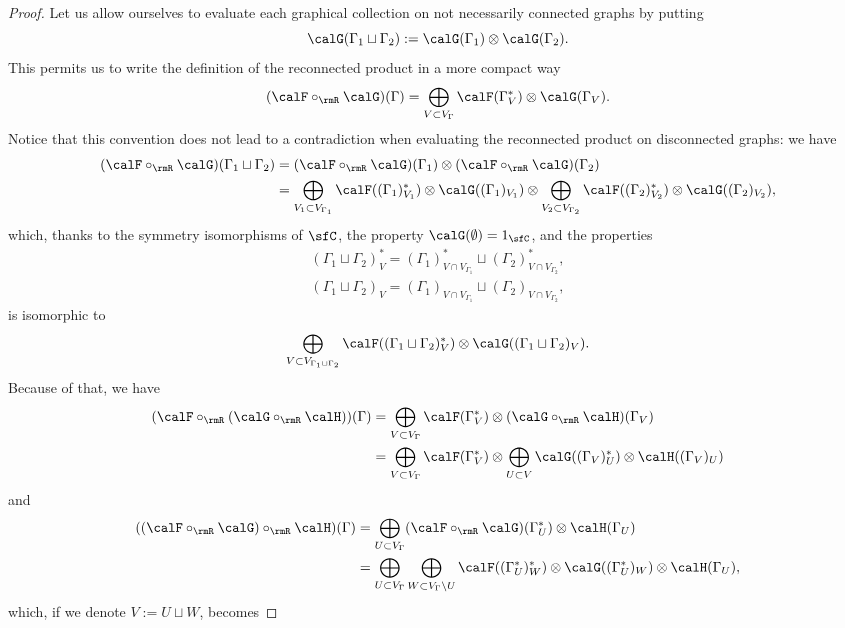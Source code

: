 \begin{proof}
Let us allow ourselves to evaluate each graphical collection on not necessarily connected graphs by putting 
 \[
\calG(\Gamma_1\sqcup\Gamma_2):=\calG(\Gamma_1)\otimes\calG(\Gamma_2).
 \]
This permits us to write the definition of the reconnected product in a more compact way
 \[
(\calF\circ_{\rmR}\calG)(\Gamma)=\bigoplus_{V\subset V_\Gamma}\calF(\Gamma^*_V)\otimes\calG(\Gamma_V).
 \]
Notice that this convention does not lead to a contradiction when evaluating the reconnected product on disconnected graphs: we have 
\begin{align*}
(\calF\circ_{\rmR}\calG)(\Gamma_1\sqcup\Gamma_2) &=
(\calF\circ_{\rmR}\calG)(\Gamma_1)\otimes (\calF\circ_{\rmR}\calG)(\Gamma_2)\\
&= \bigoplus_{V_1\subset V_{\Gamma_1}}\calF((\Gamma_1)^*_{V_1})\otimes\calG((\Gamma_1)_{V_1})\otimes
\bigoplus_{V_2\subset V_{\Gamma_2}}\calF((\Gamma_2)^*_{V_2})\otimes\calG((\Gamma_2)_{V_2}),
\end{align*}
which, thanks to the symmetry isomorphisms of $\sfC$, the property $\calG(\emptyset)=1_{\sfC}$, and the properties
\begin{gather*}
(\Gamma_1\sqcup\Gamma_2)^*_{V}=(\Gamma_1)^*_{V\cap V_{\Gamma_1}}\sqcup (\Gamma_2)^*_{V\cap V_{\Gamma_2}},\\
(\Gamma_1\sqcup\Gamma_2)_{V}=(\Gamma_1)_{V\cap V_{\Gamma_1}}\sqcup (\Gamma_2)_{V\cap V_{\Gamma_2}},
\end{gather*}
is isomorphic to 
 \[
\bigoplus_{V\subset V_{\Gamma_1\sqcup\Gamma_2}}\calF((\Gamma_1\sqcup\Gamma_2)^*_{V})\otimes\calG((\Gamma_1\sqcup\Gamma_2)_{V}).
 \] 
Because of that, we have
\begin{align*}
(\calF\circ_{\rmR}(\calG\circ_{\rmR}\calH))(\Gamma) &=
\bigoplus_{V\subset V_\Gamma}\calF(\Gamma^*_V)\otimes(\calG\circ_{\rmR}\calH)(\Gamma_V)\\
&=
\bigoplus_{V\subset V_\Gamma}\calF(\Gamma^*_V)\otimes\bigoplus_{U\subset V}\calG((\Gamma_V)^*_U)\otimes\calH((\Gamma_V)_U)
\end{align*}
and
\begin{align*}
((\calF\circ_{\rmR}\calG)\circ_{\rmR}\calH)(\Gamma) &=
\bigoplus_{U\subset V_\Gamma}(\calF\circ_{\rmR}\calG)(\Gamma^*_U)\otimes\calH(\Gamma_U)\\
&= \bigoplus_{U\subset V_\Gamma}\bigoplus_{W\subset V_\Gamma\setminus U}
\calF((\Gamma^*_U)^*_W)\otimes\calG((\Gamma^*_U)_W)\otimes \calH(\Gamma_U),
\end{align*}
which, if we denote $V:=U\sqcup W$, becomes

\end{proof}
